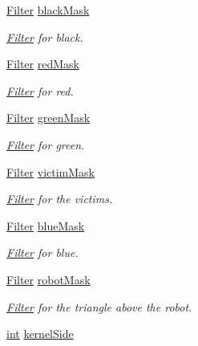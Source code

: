 \begin{DoxyCompactItemize}
\mbox{\hyperlink{class_filter}{Filter}} \mbox{\hyperlink{class_settings_a78ac37593a52a83973e18deefb2cc96c}{black\+Mask}}
\begin{DoxyCompactList}\small\item\em \mbox{\hyperlink{class_filter}{Filter}} for black. \end{DoxyCompactList}\item 
\mbox{\hyperlink{class_filter}{Filter}} \mbox{\hyperlink{class_settings_a4ded995ae1c425f92ad712d2987dce71}{red\+Mask}}
\begin{DoxyCompactList}\small\item\em \mbox{\hyperlink{class_filter}{Filter}} for red. \end{DoxyCompactList}\item 
\mbox{\hyperlink{class_filter}{Filter}} \mbox{\hyperlink{class_settings_a05138be305e15677c8a84ddf27e4d9e8}{green\+Mask}}
\begin{DoxyCompactList}\small\item\em \mbox{\hyperlink{class_filter}{Filter}} for green. \end{DoxyCompactList}\item 
\mbox{\hyperlink{class_filter}{Filter}} \mbox{\hyperlink{class_settings_ad77dc9d3ebdc000309f1279bc0f9e1ea}{victim\+Mask}}
\begin{DoxyCompactList}\small\item\em \mbox{\hyperlink{class_filter}{Filter}} for the victims. \end{DoxyCompactList}\item 
\mbox{\hyperlink{class_filter}{Filter}} \mbox{\hyperlink{class_settings_a2b425f747b936e82dfe0b609538f06f1}{blue\+Mask}}
\begin{DoxyCompactList}\small\item\em \mbox{\hyperlink{class_filter}{Filter}} for blue. \end{DoxyCompactList}\item 
\mbox{\hyperlink{class_filter}{Filter}} \mbox{\hyperlink{class_settings_aa814fd0ce673e73de3442e5bf5a26fc6}{robot\+Mask}}
\begin{DoxyCompactList}\small\item\em \mbox{\hyperlink{class_filter}{Filter}} for the triangle above the robot. \end{DoxyCompactList}\item 
\mbox{\hyperlink{draw_8hh_aa620a13339ac3a1177c86edc549fda9b}{int}} \mbox{\hyperlink{class_settings_a376418be10e2c1067b2d03c08e7b6a92}{kernel\+Side}}
\item 

\end{DoxyCompactItemize}

